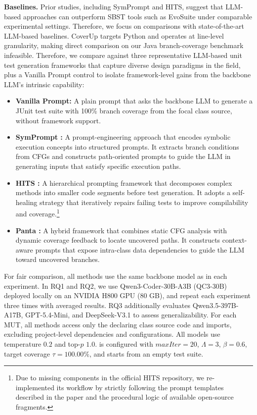 \textbf{Baselines.}
Prior studies, including SymPrompt and HITS, suggest that LLM-based approaches can outperform SBST tools such as EvoSuite under comparable experimental settings. Therefore, we focus on comparisons with state-of-the-art LLM-based baselines. CoverUp targets Python and operates at line-level granularity, making direct comparison on our Java branch-coverage benchmark infeasible. Therefore, we compare \ourmethod{} against three representative LLM-based unit test generation frameworks that capture diverse design paradigms in the field, plus a Vanilla Prompt control to isolate framework-level gains from the backbone LLM's intrinsic capability:
\begin{itemize}
    \item \textbf{Vanilla Prompt:} A plain prompt that asks the backbone LLM to generate a JUnit test suite with 100\% branch coverage from the focal class source, without framework support.
    \item \textbf{SymPrompt \cite{ryan2024}:} A prompt-engineering approach that encodes symbolic execution concepts into structured prompts. It extracts branch conditions from CFGs and constructs path-oriented prompts to guide the LLM in generating inputs that satisfy specific execution paths.
    \item \textbf{HITS \cite{wang2024c}:} A hierarchical prompting framework that decomposes complex methods into smaller code segments before test generation. It adopts a self-healing strategy that iteratively repairs failing tests to improve compilability and coverage.\footnote{Due to missing components in the official HITS repository, we re-implemented its workflow by strictly following the prompt templates described in the paper and the procedural logic of available open-source fragments.}
    \item \textbf{Panta \cite{gu2025a}:} A hybrid framework that combines static CFG analysis with dynamic coverage feedback to locate uncovered paths. It constructs context-aware prompts that expose intra-class data dependencies to guide the LLM toward uncovered branches.
\end{itemize}

For fair comparison, all methods use the same backbone model as \ourmethod{} in each experiment. In RQ1 and RQ2, we use Qwen3-Coder-30B-A3B (QC3-30B) deployed
locally on an NVIDIA H800 GPU (80 GB), and repeat each experiment three times with averaged results. RQ3 additionally evaluates Qwen3.5-397B-A17B, GPT-5.4-Mini,
and DeepSeek-V3.1 to assess generalizability. For each MUT, all methods access only the declaring class source code and imports, excluding project-level
dependencies and configurations. All models use temperature $0.2$ and top-$p$ $1.0$. \ourmethod{} is configured with $\textit{maxIter}=20$, $\Lambda=3$, $
\beta=0.6$, target coverage $\tau=100.00\%$, and starts from an empty test suite.

